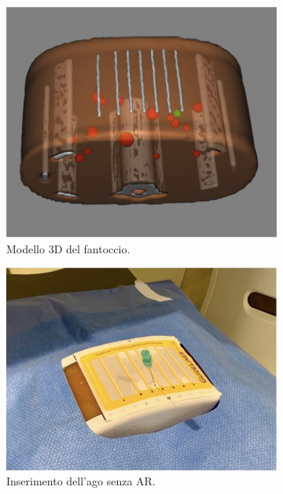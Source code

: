 \begin{figure}[t]
\begin{subfigure}{0.45\textwidth}
        \includegraphics[width=\textwidth]{images/phantom-3D-model.png}
        \caption{Modello 3D del fantoccio.}
        \label{fig:figure3b}
    \end{subfigure}
    \begin{subfigure}{0.45\textwidth}
        \centering
        \includegraphics[width=\textwidth]{images/phantom-target.png}
        \caption{Inserimento dell'ago senza AR.}
        \label{fig:figure3c}
    \end{subfigure}
    \begin{subfigure}{0.45\textwidth}
        \centering

\end{subfigure}
\end{figure}
